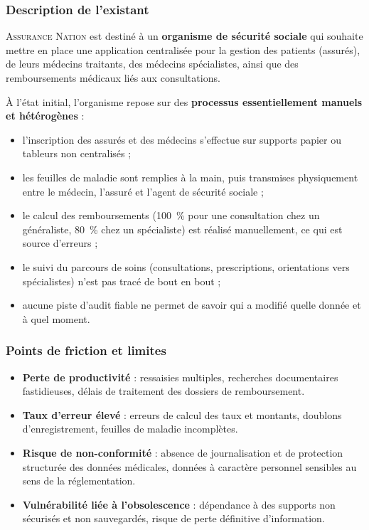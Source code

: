 \documentclass[11pt,a4paper]{article}
\begin{document}
\subsubsection{Description de l'existant}
\textsc{Assurance Nation} est destiné à un \textbf{organisme de sécurité sociale}
qui souhaite mettre en place une application centralisée pour la gestion des
patients (assurés), de leurs médecins traitants, des médecins spécialistes, ainsi
que des remboursements médicaux liés aux consultations.

À l'état initial, l'organisme repose sur des \textbf{processus essentiellement
manuels et hétérogènes} :
\begin{itemize}[leftmargin=1.4em]
  \item l'inscription des assurés et des médecins s'effectue sur supports papier
  ou tableurs non centralisés ;
  \item les feuilles de maladie sont remplies à la main, puis transmises
  physiquement entre le médecin, l'assuré et l'agent de sécurité sociale ;
  \item le calcul des remboursements (100~\% pour une consultation chez un
  généraliste, 80~\% chez un spécialiste) est réalisé manuellement, ce qui est
  source d'erreurs ;
  \item le suivi du parcours de soins (consultations, prescriptions,
  orientations vers spécialistes) n'est pas tracé de bout en bout ;
  \item aucune piste d'audit fiable ne permet de savoir qui a modifié quelle
  donnée et à quel moment.
\end{itemize}

\subsubsection{Points de friction et limites}
\begin{itemize}[leftmargin=1.4em]
  \item \textbf{Perte de productivité} : ressaisies multiples, recherches
  documentaires fastidieuses, délais de traitement des dossiers de remboursement.
  \item \textbf{Taux d'erreur élevé} : erreurs de calcul des taux et montants,
  doublons d'enregistrement, feuilles de maladie incomplètes.
  \item \textbf{Risque de non-conformité} : absence de journalisation et de
  protection structurée des données médicales, données à caractère personnel
  sensibles au sens de la réglementation.
  \item \textbf{Vulnérabilité liée à l'obsolescence} : dépendance à des supports
  non sécurisés et non sauvegardés, risque de perte définitive d'information.
\end{itemize}
\end{document}
